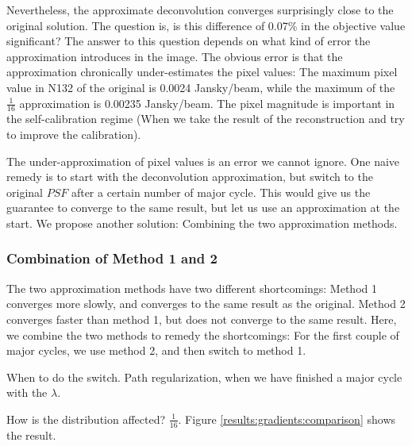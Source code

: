 Nevertheless, the approximate deconvolution converges surprisingly close to the original solution. The question is, is this difference of 0.07\% in the objective value significant? The answer to this question depends on what kind of error the approximation introduces in the image. The obvious error is that the approximation chronically under-estimates the pixel values: The maximum pixel value in N132 of the original is 0.0024 Jansky/beam, while the maximum of the $\frac{1}{16}$ approximation is 0.00235 Jansky/beam. The pixel magnitude is important in the self-calibration regime \cite{offringa2017optimized} (When we take the result of the reconstruction and try to improve the calibration).

The under-approximation of pixel values is an error we cannot ignore. One naive remedy is to start with the deconvolution approximation, but switch to the original $PSF$ after a certain number of major cycle. This would give us the guarantee to converge to the same result, but let us use an approximation at the start. We propose another solution: Combining the two approximation methods.


\subsubsection{Combination of Method 1 and 2}
The two approximation methods have two different shortcomings: Method 1 converges more slowly, and converges to the same result as the original. Method 2 converges faster than method 1, but does not converge to the same result. Here, we combine the two methods to remedy the shortcomings: For the first couple of major cycles, we use method 2, and then switch to method 1.

When to do the switch.
Path regularization, when we have finished a major cycle with the $\lambda$.

How is the distribution affected?  $\frac{1}{16}$.
Figure \ref{results:gradients:comparison} shows the result.

